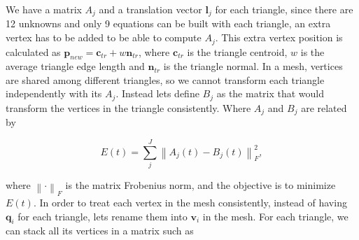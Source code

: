 \documentclass[12pt]{article}
\begin{document}
We have a matrix $A_{j}$ and a translation vector $\mathbf{l}_j$ for each triangle, since there are 12 unknowns and only 9 equations can be built with each triangle, an extra vertex has to be added to be able to compute $A_j$.
This extra vertex position is calculated as $\mathbf{p}_{new} = \mathbf{c}_{tr} + w\mathbf{n}_{tr}$, where $\mathbf{c}_{tr}$ is the triangle centroid, $w$ is the average triangle edge length and $\mathbf{n}_{tr}$ is the triangle normal. 
In a mesh, vertices are shared among different triangles, so we cannot transform each triangle independently with its $A_j$.
Instead lets define $B_{j}$ as the matrix that would transform the vertices in the triangle consistently.
Where $A_j$ and $B_j$ are related by

\begin{equation*}
E(t) = \sum_{j}^J \left \| A_j(t) - B_j(t) \right \|^2_F,
\end{equation*}

where $\left \| \cdot \right \|_F$ is the matrix Frobenius norm, and the objective is to minimize $E(t)$.
In order to treat each vertex in the mesh consistently, instead of having $\mathbf{q}_i$ for each triangle, lets rename them into $\mathbf{v}_i$ in the mesh.
For each triangle, we can stack all its vertices in a matrix such as
\end{document}
